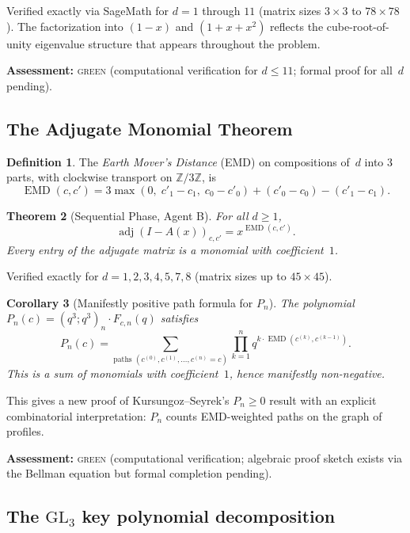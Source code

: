 \documentclass[11pt]{article}
\newtheorem{theorem}{Theorem}[section]
\newtheorem{corollary}[theorem]{Corollary}
\theoremstyle{definition}
\newtheorem{definition}[theorem]{Definition}
\begin{document}
\noindent Verified exactly via SageMath for $d = 1$ through $11$ (matrix sizes $3 \times 3$ to $78 \times 78$). The factorization into $(1 - x)$ and $(1 + x + x^2)$ reflects the cube-root-of-unity eigenvalue structure that appears throughout the problem.

\noindent\textbf{Assessment:} \textsc{green} (computational verification for $d \leq 11$; formal proof for all~$d$ pending).

\subsection{The Adjugate Monomial Theorem}\label{sec:adjugate}

\begin{definition}
The \emph{Earth Mover's Distance} (EMD) on compositions of~$d$ into 3 parts, with clockwise transport on $\mathbb{Z}/3\mathbb{Z}$, is
\[
\operatorname{EMD}(c, c') = 3 \max(0,\; c'_1 - c_1,\; c_0 - c'_0) + (c'_0 - c_0) - (c'_1 - c_1).
\]
\end{definition}

\begin{theorem}[Sequential Phase, Agent B]\label{thm:adjugate}
For all $d \geq 1$,
\[
\operatorname{adj}(I - A(x))_{c,c'} = x^{\operatorname{EMD}(c,c')}.
\]
Every entry of the adjugate matrix is a monomial with coefficient~$1$.
\end{theorem}

\noindent Verified exactly for $d = 1, 2, 3, 4, 5, 7, 8$ (matrix sizes up to $45 \times 45$).

\begin{corollary}[Manifestly positive path formula for $P_n$]\label{cor:Pn}
The polynomial $P_n(c) = (q^3; q^3)_n \cdot F_{c,n}(q)$ satisfies
\[
P_n(c) = \sum_{\text{paths } (c^{(0)}, c^{(1)}, \ldots, c^{(n)} = c)} \prod_{k=1}^n q^{k \cdot \operatorname{EMD}(c^{(k)}, c^{(k-1)})}.
\]
This is a sum of monomials with coefficient~$1$, hence manifestly non-negative.
\end{corollary}

\noindent This gives a new proof of Kursungoz--Seyrek's $P_n \geq 0$ result with an explicit combinatorial interpretation: $P_n$ counts EMD-weighted paths on the graph of profiles.

\noindent\textbf{Assessment:} \textsc{green} (computational verification; algebraic proof sketch exists via the Bellman equation but formal completion pending).

\subsection{The \texorpdfstring{$\mathrm{GL}_3$}{GL3} key polynomial decomposition}\label{sec:GL3}
\end{document}
